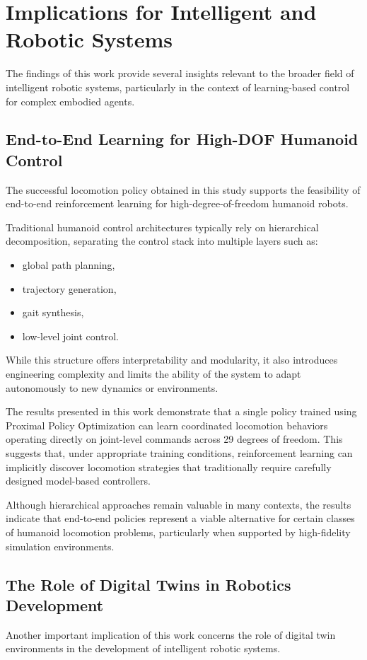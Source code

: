 \documentclass[pdflatex,sn-mathphys-num]{sn-jnl}%
\theoremstyle{thmstyleone}%
\theoremstyle{thmstyletwo}%
\theoremstyle{thmstylethree}%
\begin{document}
\section{Implications for Intelligent and Robotic Systems}
\label{implication}
The findings of this work provide several insights relevant to the broader field of intelligent robotic systems, particularly in the context of learning-based control for complex embodied agents.

\subsection{End-to-End Learning for High-DOF Humanoid Control}
The successful locomotion policy obtained in this study supports the feasibility of end-to-end reinforcement learning for high-degree-of-freedom humanoid robots.

Traditional humanoid control architectures typically rely on hierarchical decomposition, separating the control stack into multiple layers such as:
\begin{itemize}
    \item global path planning,
    \item trajectory generation,
    \item gait synthesis,
    \item low-level joint control.
\end{itemize} 

While this structure offers interpretability and modularity, it also introduces engineering complexity and limits the ability of the system to adapt autonomously to new dynamics or environments.

The results presented in this work demonstrate that a single policy trained using Proximal Policy Optimization can learn coordinated locomotion behaviors operating directly on joint-level commands across 29 degrees of freedom. This suggests that, under appropriate training conditions, reinforcement learning can implicitly discover locomotion strategies that traditionally require carefully designed model-based controllers.

Although hierarchical approaches remain valuable in many contexts, the results indicate that end-to-end policies represent a viable alternative for certain classes of humanoid locomotion problems, particularly when supported by high-fidelity simulation environments.

\subsection{The Role of Digital Twins in Robotics Development}
Another important implication of this work concerns the role of digital twin environments in the development of intelligent robotic systems.
\end{document}
